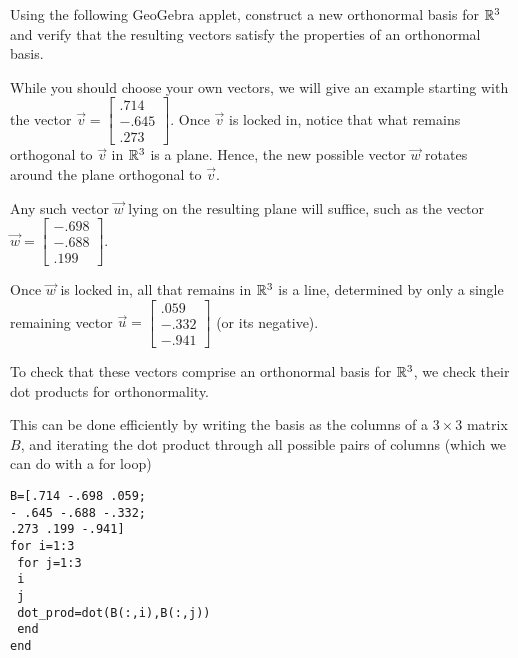 \documentclass{ximera}
\begin{document}
\begin{exploration}
   Using the following GeoGebra applet, construct a new orthonormal basis for $\mathbb{R}^3$ and verify that the resulting vectors satisfy the properties of an orthonormal basis.

   \begin{center}
   \end{center}



   \begin{hint}

      While you should choose your own vectors, we will give an example starting with the vector $\vec{v}=\begin{bmatrix}
         .714\\-.645\\.273
      \end{bmatrix}$. Once $\vec{v}$ is locked in, notice that what remains orthogonal to $\vec{v}$ in $\mathbb{R}^3$ is a plane. Hence, the new possible vector $\vec{w}$ rotates around the plane orthogonal to $\vec{v}$.

      Any such vector $\vec{w}$ lying on the resulting plane will suffice, such as the vector $\vec{w}=\begin{bmatrix}
         -.698\\-.688\\.199
      \end{bmatrix}$.
  
   
   Once $\vec{w}$ is locked in, all that remains in $\mathbb{R}^3$ is a line, determined by only a single remaining vector $\vec{u}=\begin{bmatrix}
      .059\\-.332\\-.941
   \end{bmatrix}$ (or its negative).

   To check that these vectors comprise an orthonormal basis for $\mathbb{R}^3$, we check their dot products for orthonormality. 

   This can be done efficiently by writing the basis as the columns of a $3\times 3$ matrix $B$, and iterating the dot product through all possible pairs of columns (which we can do with a for loop)

   \texttt{B=[.714 -.698 .059;} \\
   \texttt{- .645 -.688 -.332;} \\
   \texttt{.273 .199 -.941]} \\
   \texttt{for i=1:3} \\
   \texttt{ for j=1:3} \\
   \texttt{    i} \\
   \texttt{    j} \\
   \texttt{    dot\_prod=dot(B(:,i),B(:,j))} \\
   \texttt{ end} \\
   \texttt{end}


\end{hint}
\end{exploration}
\end{document}
